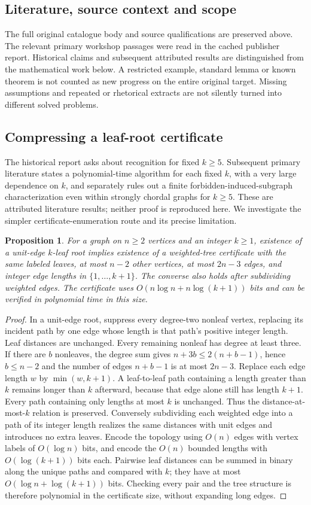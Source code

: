 \documentclass[11pt]{article}
\newtheorem{proposition}{Proposition}
\begin{document}
\subsection{Literature, source context and scope}
The full original catalogue body and source qualifications are preserved above. The relevant primary workshop passages were read in the cached publisher report. Historical claims and subsequent attributed results are distinguished from the mathematical work below. A restricted example, standard lemma or known theorem is not counted as new progress on the entire original target. Missing assumptions and repeated or rhetorical extracts are not silently turned into different solved problems.

\subsection{Compressing a leaf-root certificate}
The historical report asks about recognition for fixed $k\ge5$. Subsequent primary literature states a polynomial-time algorithm for each fixed $k$, with a very large dependence on $k$, and separately rules out a finite forbidden-induced-subgraph characterization even within strongly chordal graphs for $k\ge5$. These are attributed literature results; neither proof is reproduced here. We investigate the simpler certificate-enumeration route and its precise limitation.
\begin{proposition}
For a graph on $n\ge2$ vertices and an integer $k\ge1$, existence of a unit-edge $k$-leaf root implies existence of a weighted-tree certificate with the same labeled leaves, at most $n-2$ other vertices, at most $2n-3$ edges, and integer edge lengths in $\{1,\ldots,k+1\}$. The converse also holds after subdividing weighted edges. The certificate uses $O(n\log n+n\log(k+1))$ bits and can be verified in polynomial time in this size.
\end{proposition}
\begin{proof}
In a unit-edge root, suppress every degree-two nonleaf vertex, replacing its incident path by one edge whose length is that path's positive integer length. Leaf distances are unchanged. Every remaining nonleaf has degree at least three. If there are $b$ nonleaves, the degree sum gives $n+3b\le2(n+b-1)$, hence $b\le n-2$ and the number of edges $n+b-1$ is at most $2n-3$.
Replace each edge length $w$ by $\min(w,k+1)$. A leaf-to-leaf path containing a length greater than $k$ remains longer than $k$ afterward, because that edge alone still has length $k+1$. Every path containing only lengths at most $k$ is unchanged. Thus the distance-at-most-$k$ relation is preserved. Conversely subdividing each weighted edge into a path of its integer length realizes the same distances with unit edges and introduces no extra leaves.
Encode the topology using $O(n)$ edges with vertex labels of $O(\log n)$ bits, and encode the $O(n)$ bounded lengths with $O(\log(k+1))$ bits each. Pairwise leaf distances can be summed in binary along the unique paths and compared with $k$; they have at most $O(\log n+\log(k+1))$ bits. Checking every pair and the tree structure is therefore polynomial in the certificate size, without expanding long edges.
\end{proof}
\end{document}
